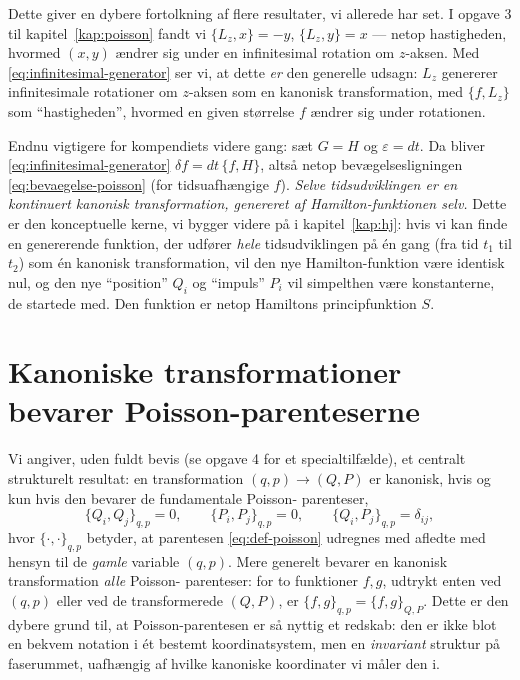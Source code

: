 \begin{bemaerkning}
Dette giver en dybere fortolkning af flere resultater, vi allerede har
set. I opgave 3 til kapitel~\ref{kap:poisson} fandt vi
$\{L_z,x\}=-y$, $\{L_z,y\}=x$ — netop hastigheden, hvormed $(x,y)$
ændrer sig under en infinitesimal rotation om $z$-aksen. Med
\eqref{eq:infinitesimal-generator} ser vi, at dette \emph{er} den
generelle udsagn: $L_z$ genererer infinitesimale rotationer om
$z$-aksen som en kanonisk transformation, med $\{f,L_z\}$ som ``hastigheden'',
hvormed en given størrelse $f$ ændrer sig under rotationen.

Endnu vigtigere for kompendiets videre gang: sæt $G=H$ og
$\varepsilon = dt$. Da bliver \eqref{eq:infinitesimal-generator}
$\delta f = dt\,\{f,H\}$, altså netop bevægelsesligningen
\eqref{eq:bevaegelse-poisson} (for tidsuafhængige $f$). \emph{Selve
tidsudviklingen er en kontinuert kanonisk transformation, genereret af
Hamilton-funktionen selv.} Dette er den konceptuelle kerne, vi bygger
videre på i kapitel~\ref{kap:hj}: hvis vi kan finde en genererende
funktion, der udfører \emph{hele} tidsudviklingen på én gang (fra
tid $t_1$ til $t_2$) som én kanonisk transformation, vil den nye
Hamilton-funktion være identisk nul, og den nye ``position'' $Q_i$ og
``impuls'' $P_i$ vil simpelthen være konstanterne, de startede med. Den
funktion er netop Hamiltons principfunktion $S$.
\end{bemaerkning}

\section{Kanoniske transformationer bevarer Poisson-parenteserne}

Vi angiver, uden fuldt bevis (se opgave 4 for et specialtilfælde), et
centralt strukturelt resultat: en transformation $(q,p)\to(Q,P)$ er
kanonisk, hvis og kun hvis den bevarer de fundamentale Poisson-
parenteser,
\begin{equation}
  \{Q_i,Q_j\}_{q,p} = 0, \qquad \{P_i,P_j\}_{q,p} = 0, \qquad \{Q_i,P_j\}_{q,p} = \delta_{ij},
  \label{eq:kanonisk-poisson-betingelse}
\end{equation}
hvor $\{\cdot,\cdot\}_{q,p}$ betyder, at parentesen \eqref{eq:def-poisson}
udregnes med afledte med hensyn til de \emph{gamle} variable $(q,p)$.
Mere generelt bevarer en kanonisk transformation \emph{alle} Poisson-
parenteser: for to funktioner $f,g$, udtrykt enten ved $(q,p)$ eller
ved de transformerede $(Q,P)$, er $\{f,g\}_{q,p}=\{f,g\}_{Q,P}$. Dette
er den dybere grund til, at Poisson-parentesen er så nyttig et
redskab: den er ikke blot en bekvem notation i ét bestemt
koordinatsystem, men en \emph{invariant} struktur på faserummet,
uafhængig af hvilke kanoniske koordinater vi måler den i.

